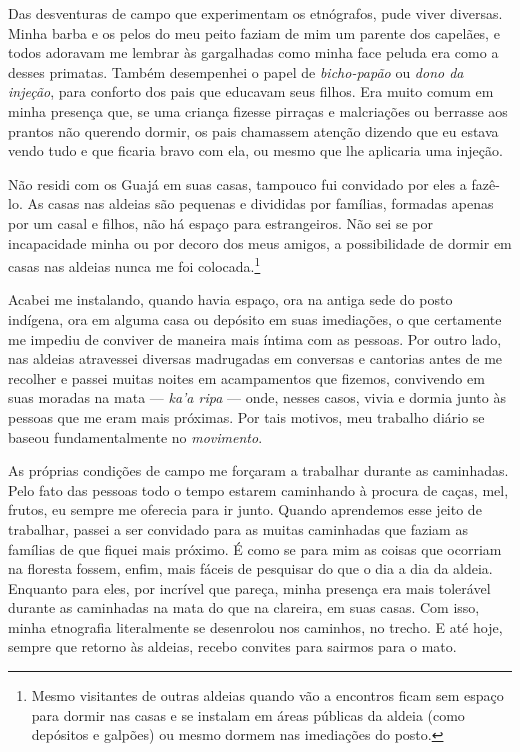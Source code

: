Das desventuras de campo que experimentam os etnógrafos, pude viver
diversas. Minha barba e os pelos do meu peito faziam de mim um parente
dos capelães, e todos adoravam me lembrar às gargalhadas como minha face
peluda era como a desses primatas. Também desempenhei o papel de
\textit{bicho-papão} ou \textit{dono da injeção}, para conforto dos pais que
educavam seus filhos. Era muito comum em minha presença que, se uma
criança fizesse pirraças e malcriações ou berrasse aos prantos não
querendo dormir, os pais chamassem atenção dizendo que eu estava vendo
tudo e que ficaria bravo com ela, ou mesmo que lhe aplicaria uma
injeção.

Não residi com os Guajá em suas casas, tampouco fui convidado por eles a
fazê-lo. As casas nas aldeias são pequenas e divididas por famílias,
formadas apenas por um casal e filhos, não há espaço para estrangeiros.
Não sei se por incapacidade minha ou por decoro dos meus amigos, a
possibilidade de dormir em casas nas aldeias nunca me foi
colocada.\footnote{Mesmo visitantes de outras aldeias quando vão a
  encontros ficam sem espaço para dormir nas casas e se instalam em
  áreas públicas da aldeia (como depósitos e galpões) ou mesmo dormem
  nas imediações do posto.} 

  Acabei me instalando, quando havia espaço,
ora na antiga sede do posto indígena, ora em alguma casa ou depósito em
suas imediações, o que certamente me impediu de conviver de maneira mais
íntima com as pessoas. Por outro lado, nas aldeias atravessei diversas
madrugadas em conversas e cantorias antes de me recolher e passei muitas
noites em acampamentos que fizemos, convivendo em suas moradas na mata --- \textit{ka'a ripa} --- onde, nesses casos, vivia e dormia junto às pessoas
que me eram mais próximas. Por tais motivos, meu trabalho diário se
baseou fundamentalmente no \textit{movimento}. 

As próprias condições de
campo me forçaram a trabalhar durante as caminhadas. Pelo fato das
pessoas todo o tempo estarem caminhando à procura de caças, mel, frutos,
eu sempre me oferecia para ir junto. Quando aprendemos esse
jeito de trabalhar, passei a ser convidado para as muitas caminhadas que
faziam as famílias de que fiquei mais próximo. É como se para mim as
coisas que ocorriam na floresta fossem, enfim, mais fáceis de pesquisar
do que o dia a dia da aldeia. Enquanto para eles, por incrível que
pareça, minha presença era mais tolerável durante as caminhadas na mata
do que na clareira, em suas casas. Com isso, minha etnografia
literalmente se desenrolou nos caminhos, no trecho. E até hoje, sempre
que retorno às aldeias, recebo convites para sairmos para o mato.

